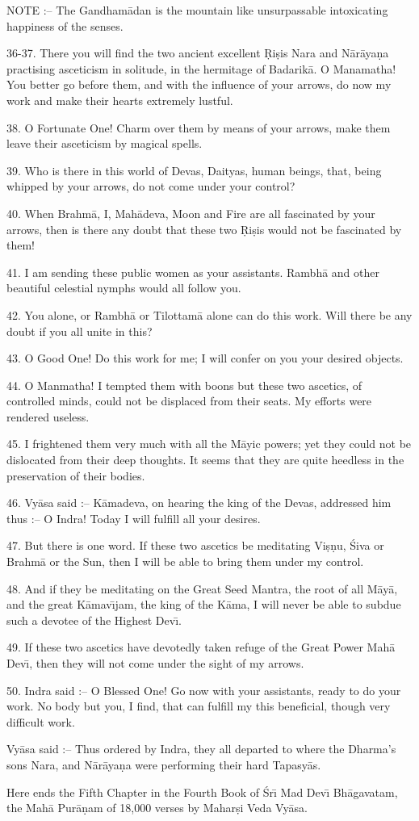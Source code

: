 NOTE :-- The Gandham\=adan is the mountain like unsurpassable intoxicating happiness of the senses.

36-37. There you will find the two ancient excellent \d{R}i\d{s}is Nara and N\=ar\=aya\d{n}a practising asceticism in solitude, in the hermitage of Badarik\=a. O Manamatha! You better go before them, and with the influence of your arrows, do now my work and make their hearts extremely lustful.

38. O Fortunate One! Charm over them by means of your arrows, make them leave their asceticism by magical spells.

39. Who is there in this world of Devas, Daityas, human beings, that, being whipped by your arrows, do not come under your control?

40. When Brahm\=a, I, Mah\=adeva, Moon and Fire are all fascinated by your arrows, then is there any doubt that these two \d{R}i\d{s}is would not be fascinated by them!

41. I am sending these public women as your assistants. Rambh\=a and other beautiful celestial nymphs would all follow you.

42. You alone, or Rambh\=a or Tilottam\=a alone can do this work. Will there be any doubt if you all unite in this?

43. O Good One! Do this work for me; I will confer on you your desired objects.

44. O Manmatha! I tempted them with boons but these two ascetics, of controlled minds, could not be displaced from their seats. My efforts were rendered useless.

45. I frightened them very much with all the M\=ayic powers; yet they could not be dislocated from their deep thoughts. It seems that they are quite heedless in the preservation of their bodies.

46. Vy\=asa said :-- K\=amadeva, on hearing the king of the Devas, addressed him thus :-- O Indra! Today I will fulfill all your desires.

47. But there is one word. If these two ascetics be meditating Vi\d{s}\d{n}u, \'Siva or Brahm\=a or the Sun, then I will be able to bring them under my control.

48. And if they be meditating on the Great Seed Mantra, the root of all M\=ay\=a, and the great K\=amav\={\i}jam, the king of the K\=ama, I will never be able to subdue such a devotee of the Highest Dev\={\i}.

49. If these two ascetics have devotedly taken refuge of the Great Power Mah\=a Dev\={\i}, then they will not come under the sight of my arrows.

50. Indra said :-- O Blessed One! Go now with your assistants, ready to do your work. No body but you, I find, that can fulfill my this beneficial, though very difficult work.

Vy\=asa said :-- Thus ordered by Indra, they all departed to where the Dharma's sons Nara, and N\=ar\=aya\d{n}a were performing their hard Tapasy\=as.

Here ends the Fifth Chapter in the Fourth Book of \'Sr\={\i} Mad Dev\={\i} Bh\=agavatam, the Mah\=a Pur\=a\d{n}am of 18,000 verses by Mahar\d{s}i Veda Vy\=asa.



